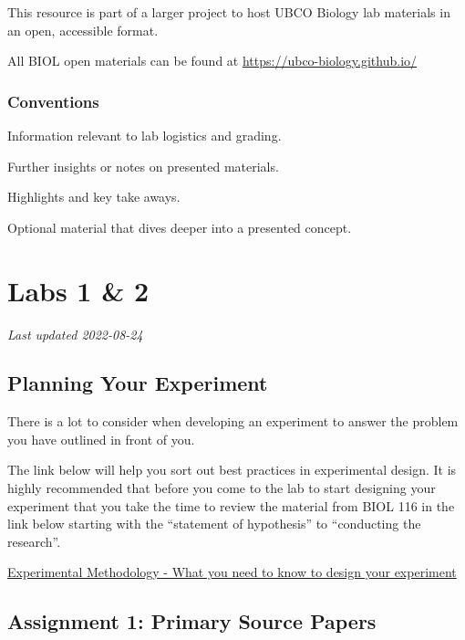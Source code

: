 \documentclass[
]{book}
\begin{document}
This resource is part of a larger project to host UBCO Biology lab materials in an open, accessible format.

All BIOL open materials can be found at \url{https://ubco-biology.github.io/}

\hypertarget{conventions}{%
\section*{Conventions}\label{conventions}}

Information relevant to lab logistics and grading.

Further insights or notes on presented materials.

Highlights and key take aways.

Optional material that dives deeper into a presented concept.

\hypertarget{part-labs-1-2}{%
\part*{Labs 1 \& 2}\label{part-labs-1-2}}

\emph{Last updated 2022-08-24}

\hypertarget{planning-your-experiment}{%
\chapter*{Planning Your Experiment}\label{planning-your-experiment}}

There is a lot to consider when developing an experiment to answer the problem you have outlined in front of you.

The link below will help you sort out best practices in experimental design. It is highly recommended that before you come to the lab to start designing your experiment that you take the time to review the material from BIOL 116 in the link below starting with the ``statement of hypothesis'' to ``conducting the research''.

\href{https://ubco-biology.github.io/BIOL-116-Lab-Manual/statement-of-hypothesis.html}{Experimental Methodology - What you need to know to design your experiment}

\hypertarget{assignment-1-primary-source-papers}{%
\chapter*{Assignment 1: Primary Source Papers}\label{assignment-1-primary-source-papers}}
\end{document}
